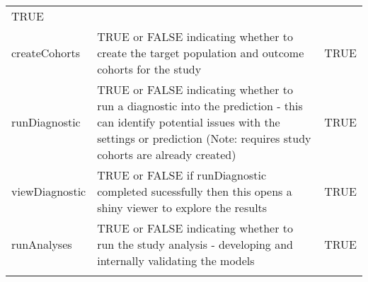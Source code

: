 \documentclass[
]{article}
\begin{document}
\begin{longtable}[]{@{}lll@{}}
\begin{minipage}[t]{0.24\columnwidth}
TRUE\strut
\end{minipage}\tabularnewline
\begin{minipage}[t]{0.21\columnwidth}\raggedright
createCohorts\strut
\end{minipage} & \begin{minipage}[t]{0.46\columnwidth}\raggedright
TRUE or FALSE indicating whether to create the target population and
outcome cohorts for the study\strut
\end{minipage} & \begin{minipage}[t]{0.24\columnwidth}\raggedright
TRUE\strut
\end{minipage}\tabularnewline
\begin{minipage}[t]{0.21\columnwidth}\raggedright
runDiagnostic\strut
\end{minipage} & \begin{minipage}[t]{0.46\columnwidth}\raggedright
TRUE or FALSE indicating whether to run a diagnostic into the prediction
- this can identify potential issues with the settings or prediction
(Note: requires study cohorts are already created)\strut
\end{minipage} & \begin{minipage}[t]{0.24\columnwidth}\raggedright
TRUE\strut
\end{minipage}\tabularnewline
\begin{minipage}[t]{0.21\columnwidth}\raggedright
viewDiagnostic\strut
\end{minipage} & \begin{minipage}[t]{0.46\columnwidth}\raggedright
TRUE or FALSE if runDiagnostic completed sucessfully then this opens a
shiny viewer to explore the results\strut
\end{minipage} & \begin{minipage}[t]{0.24\columnwidth}\raggedright
TRUE\strut
\end{minipage}\tabularnewline
\begin{minipage}[t]{0.21\columnwidth}\raggedright
runAnalyses\strut
\end{minipage} & \begin{minipage}[t]{0.46\columnwidth}\raggedright
TRUE or FALSE indicating whether to run the study analysis - developing
and internally validating the models\strut
\end{minipage} & \begin{minipage}[t]{0.24\columnwidth}\raggedright
TRUE\strut
\end{minipage}\tabularnewline
\begin{minipage}[t]{0.21\columnwidth}\raggedright

\end{minipage}
\end{longtable}
\end{document}
